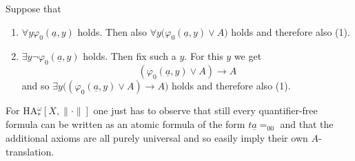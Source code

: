 \documentclass[1p]{elsarticle}
\newcommand{\tup}{\underline} %
\theoremstyle{plain}
\theoremstyle{definition}
\theoremstyle{remark}
\renewenvironment{proof}[1][]{\noindent{\bf Proof{#1}. }}{\nopagebreak[4]{\hspace*{\fill}
  $\Box$              %
 }{\vspace{2ex}}}
\renewcommand{\phi}{\varphi}
\theoremstyle{definition}
\begin{document}
{\begin{proof}
Suppose that
\begin{enumerate}
\item $\forall y \phi_0(\tup a,y)$ holds. Then also $\forall y \big( \phi_0(\tup a,y) \vee A\big)$ holds and therefore also (1).
\item $\exists y \neg\phi_0(\tup a,y)$ holds. Then fix such a $y$. For this $y$ we get 
\[(\phi_0(\tup a,y) \vee A) \rightarrow A\]
and so $ \exists y \big(  (\phi_0(\tup a,y) \vee A) \rightarrow A\big)$ holds and therefore also (1). 
\end{enumerate}
For HA$_*^{\omega}[X,\|\cdot\|]$ one just has to observe that still every 
quantifier-free formula can be written as an atomic formula of the form 
$t\underline{a}=_00$ and that the additional axioms are all purely universal 
and so easily imply their own $A$-translation.  
\end{proof} 

}
\end{document}
